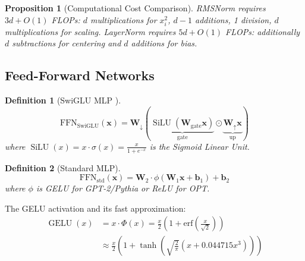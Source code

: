 \documentclass[12pt,a4paper]{article}
\newtheorem{definition}{Definition}[section]
\newtheorem{proposition}[theorem]{Proposition}
\DeclareMathOperator{\SiLU}{SiLU}
\DeclareMathOperator{\GELU}{GELU}
\begin{document}
\begin{proposition}[Computational Cost Comparison]
\label{prop:norm_cost}
RMSNorm requires $3d + O(1)$ FLOPs: $d$ multiplications for $x_i^2$, $d-1$ additions, 1 division, $d$ multiplications for scaling. LayerNorm requires $5d + O(1)$ FLOPs: additionally $d$ subtractions for centering and $d$ additions for bias.
\end{proposition}

\subsection{Feed-Forward Networks}

\begin{definition}[SwiGLU MLP \citep{shazeer2020glu}]
\begin{equation}
\text{FFN}_{\text{SwiGLU}}(\bm{x}) = \bm{W}_{\downarrow}\left(\underbrace{\SiLU(\bm{W}_{\text{gate}}\bm{x})}_{\text{gate}} \odot \underbrace{\bm{W}_{\uparrow}\bm{x}}_{\text{up}}\right)
\label{eq:swiglu}
\end{equation}
where $\SiLU(x) = x \cdot \sigma(x) = \frac{x}{1 + e^{-x}}$ is the Sigmoid Linear Unit.
\end{definition}

\begin{definition}[Standard MLP]
\begin{equation}
\text{FFN}_{\text{std}}(\bm{x}) = \bm{W}_2 \cdot \phi\left(\bm{W}_1 \bm{x} + \bm{b}_1\right) + \bm{b}_2
\label{eq:standard_mlp}
\end{equation}
where $\phi$ is GELU \citep{hendrycks2016gelu} for GPT-2/Pythia or ReLU for OPT.
\end{definition}

The GELU activation and its fast approximation:
\begin{align}
\GELU(x) &= x \cdot \Phi(x) = \frac{x}{2}\left(1 + \text{erf}\left(\frac{x}{\sqrt{2}}\right)\right) \label{eq:gelu_exact} \\
&\approx \frac{x}{2}\left(1 + \tanh\left(\sqrt{\frac{2}{\pi}}\left(x + 0.044715 x^3\right)\right)\right) \label{eq:gelu_approx}
\end{align}
\end{document}
